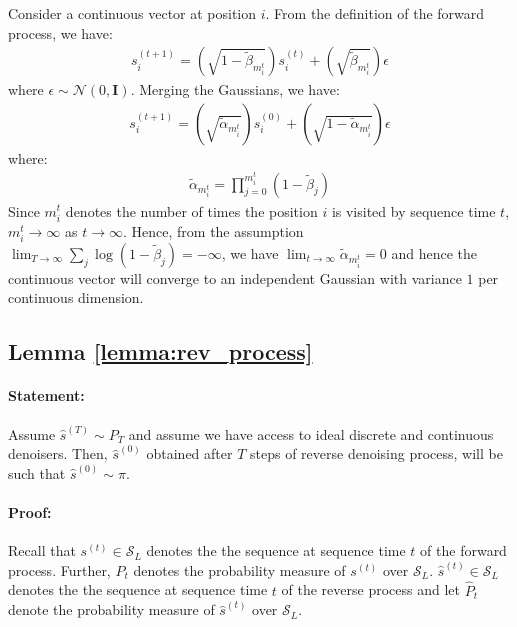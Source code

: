 Consider a continuous vector at position $i$. From the definition of the forward process, we have:
\begin{align}
    s^{(t+1)}_{i} = \left(\sqrt{1 - \tilde{\beta}_{m_{i}^t}}\right) s^{(t)}_{i} + \left(\sqrt{\tilde{\beta}_{m_{i}^t}}\right) \epsilon
\end{align}
where $\epsilon \sim \mathcal{N}(0, \mathbf{I})$. Merging the Gaussians, we have:
\begin{align*}
    s^{(t+1)}_{i} = \left(\sqrt{\tilde{\alpha}_{m_{i}^t}}\right) s^{(0)}_{i} + \left(\sqrt{1 - \tilde{\alpha}_{m_{i}^t}}\right) \epsilon
\end{align*}
where:
\begin{align*}
    \tilde{\alpha}_{m_{i}^t} = \prod_{j = 0}^{m_{i}^t} (1 - \tilde{\beta}_j)
\end{align*}
Since $m_i^{t}$ denotes the number of times the position $i$ is visited by sequence time $t$,  $m_i^{t} \rightarrow \infty$ as $t \rightarrow \infty$. Hence, from the assumption $\lim_{T \rightarrow \infty} \sum_{j} \log \left(1- \tilde{\beta}_j\right) = -\infty$, we have $\lim_{t \rightarrow \infty}\tilde{\alpha}_{m_{i}^t} = 0$ and hence the continuous vector will converge to an independent Gaussian with variance $1$ per continuous dimension.

\newpage

\subsection{Lemma \ref{lemma:rev_process}}

\paragraph{Statement:\\}
Assume $\hat{s}^{(T)} \sim P_T$ and assume we have access to ideal discrete and continuous denoisers. Then, $\hat{s}^{(0)}$ obtained after $T$ steps of reverse denoising process, will be such that $\hat{s}^{(0)} \sim \pi$.

\paragraph{Proof:\\}

Recall that $s^{(t)} \in \mathcal{S}_{L}$ denotes the the sequence at sequence time $t$ of the forward process. Further, $P_{t}$ denotes the probability measure of $s^{(t)}$ over $\mathcal{S}_{L}$. $\hat{s}^{(t)} \in \mathcal{S}_{L}$ denotes the the sequence at sequence time $t$ of the reverse process and let $\hat{P}_{t}$ denote the probability measure of $\hat{s}^{(t)}$ over $\mathcal{S}_{L}$.

